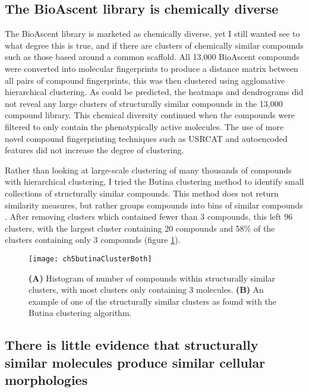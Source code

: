 \documentclass[a4paper,11pt,twoside,openright]{scrbook}
\begin{document}
\subsection{The BioAscent library is chemically diverse}
The BioAscent library is marketed as chemically diverse, yet I still wanted see to what degree this is true, and if there are clusters of chemically similar compounds such as those based around a common scaffold.
All 13,000 BioAscent compounds were converted into molecular fingerprints to produce a distance matrix between all pairs of compound fingerprints, this was then clustered using agglomative hierarchical clustering.
As could be predicted, the heatmaps and dendrograms did not reveal any large clusters of structurally similar compounds in the 13,000 compound library.
This chemical diversity continued when the compounds were filtered to only contain the phenotypically active molecules.
The use of more novel compound fingerprinting techniques such as USRCAT \cite{Schreyer2012} and autoencoded features \cite{Gomez-Bombarelli2016} did not increase the degree of clustering.


Rather than looking at large-scale clustering of many thousands of compounds with hierarchical clustering, I tried the Butina clustering method to identify small collections of structurally similar compounds.
This method does not return similarity measures, but rather groups compounds into bins of similar compounds \cite{Butina1999}.
After removing clusters which contained fewer than 3 compounds, this left 96 clusters, with the largest cluster containing 20 compounds and 58\% of the clusters containing only 3 compounds (figure \ref{figure:butina_clusters}).

\begin{figure}
    \captionsetup{width=0.8\textwidth}
    \caption[Histogram of structural cluster sizes and example of molecules within a cluster]{
        \textbf{(A)} Histogram of number of compounds within structurally similar clusters, with most clusters only containing 3 molecules.
        \textbf{(B)} An example of one of the structurally similar clusters as found with the Butina clustering algorithm. 
}
    \texttt{[image: ch5butinaClusterBoth]}
    \label{figure:butina_clusters}
\end{figure}



\subsection{There is little evidence that structurally similar molecules produce similar cellular morphologies}
\end{document}
